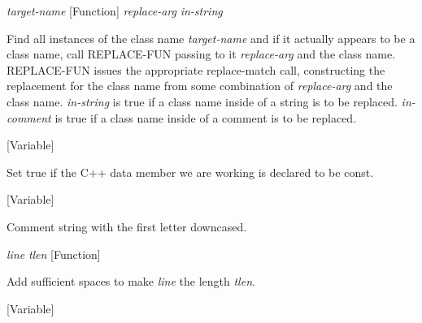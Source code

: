 \vspace{1em}
\noindent
{}
\usebox{\funcname}\emph{target-name}
 \hfill [Function]
\hspace*{\wd\funcname}\emph{replace-arg}
\hspace*{\wd\funcname}\emph{in-string}
\hspace*{\wd\funcname}

\begin{doc-string}
Find all instances of the class name \emph{target-name} and if it actually appears
to be a class name, call REPLACE-FUN passing to it \emph{replace-arg} and the class
name.  REPLACE-FUN issues the appropriate replace-match call, constructing the
replacement for the class name from some combination of \emph{replace-arg} and the
class name.  \emph{in-string} is true if a class name inside of a string is to be
replaced.  \emph{in-comment} is true if a class name inside of a comment is to be
replaced.
\end{doc-string}

\vspace{1em}
\noindent
{}
\usebox{\funcname}
 \hfill [Variable]

\begin{doc-string}
Set true if the C++ data member we are working is declared to be const.
\end{doc-string}

\vspace{1em}
\noindent
{}
\usebox{\funcname}
 \hfill [Variable]

\begin{doc-string}
Comment string with the first letter downcased.
\end{doc-string}

\vspace{1em}
\noindent
{}
\usebox{\funcname}\emph{line} \emph{tlen}
 \hfill [Function]

\begin{doc-string}
Add sufficient spaces to make \emph{line} the length \emph{tlen}.
\end{doc-string}

\vspace{1em}
\noindent
{}
\usebox{\funcname}
 \hfill [Variable]

